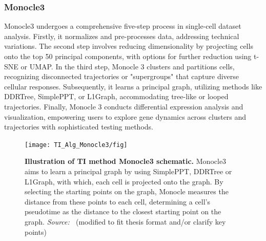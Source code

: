 \subsubsection{Monocle3}
Monocle3 undergoes a comprehensive five-step process in single-cell dataset analysis\citep{cao2019monocle3}. Firstly, it normalizes and pre-processes data, addressing technical variations. The second step involves reducing dimensionality by projecting cells onto the top 50 principal components, with options for further reduction using t-SNE or UMAP. In the third step, Monocle 3 clusters and partitions cells, recognizing disconnected trajectories or "supergroups" that capture diverse cellular responses. Subsequently, it learns a principal graph, utilizing methods like DDRTree, SimplePPT, or L1Graph, accommodating tree-like or looped trajectories. Finally, Monocle 3 conducts differential expression analysis and visualization, empowering users to explore gene dynamics across clusters and trajectories with sophisticated testing methods.
\begin{figure}[ht!]
	\centering
	\texttt{[image: TI\_Alg\_Monocle3/fig]}
	\vspace{0.1cm}
	\caption[Illustration of TI method Monocle3 schematic.]{\textbf{Illustration of TI method Monocle3 schematic.} Monocle3 aims to learn a principal graph by using SimplePPT, DDRTree or L1Graph, with which, each cell is projected onto the graph. By selecting the starting points on the graph, Monocle measures the distance from these points to each cell, determining a cell's pseudotime as the distance to the closest starting point on the graph. \emph{Source: ~\cite{cao2019monocle3}}(modified to fit thesis format and/or clarify key points)
	}
	\label{fig:TI_Alg_Monocle3}
\end{figure}

